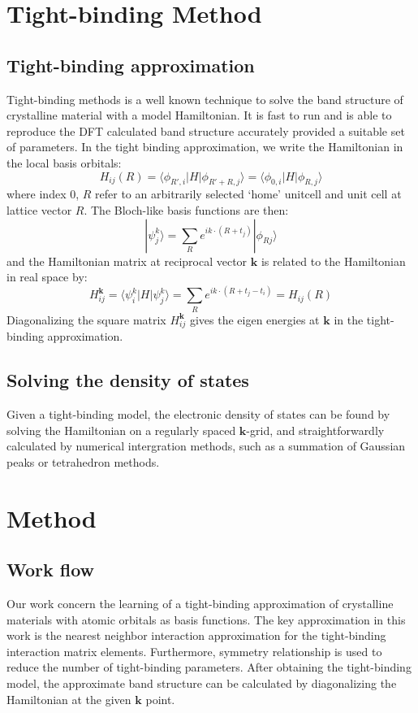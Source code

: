 \documentclass{article}
\begin{document}
\section{Tight-binding Method}
\subsection{Tight-binding approximation}
Tight-binding methods is a well known technique to solve the band structure of 
crystalline material with a model Hamiltonian\cite{ziman_principles_1999}. 
It is fast to run and is able to 
reproduce the DFT calculated band structure accurately provided a suitable set of 
parameters. 
In the tight binding approximation, we write the Hamiltonian in the local 
basis orbitals:
\begin{equation}
    H_{ij}(R) = \langle \phi_{R',i} | H | \phi_{R'+R,j} \rangle = \langle \phi_{0,i} | H | \phi_{R,j} \rangle
\end{equation}
where index 0, $R$ refer to an arbitrarily selected `home' unitcell and unit cell at 
lattice vector $R$. The Bloch-like basis functions are then:
\begin{equation}
    |\psi_j^k\rangle = \sum_R e^{ik\cdot(R+t_j)} |\phi_{Rj} \rangle
\end{equation}
and the Hamiltonian matrix at reciprocal vector $\mathbf{k}$ is related to the 
Hamiltonian in real space by:
\begin{equation}
    H_{ij}^{\mathbf{k}} = \langle \psi_i^k | H |\psi_j^k\rangle = \sum_R e^{ik\cdot(R+t_j-t_i)} = H_{ij}(R)
\end{equation}
Diagonalizing the square matrix $H_{ij}^{\mathbf{k}}$ gives the eigen energies at $\mathbf{k}$
in the tight-binding approximation. 

\subsection{Solving the density of states}
Given a tight-binding model, the electronic density of states can be found by solving the 
Hamiltonian on a regularly spaced $\mathbf{k}$-grid, and straightforwardly calculated 
by numerical intergration methods, such as a summation of Gaussian peaks or tetrahedron methods. 

\section{Method}
\subsection{Work flow}
Our work concern the learning of a tight-binding approximation of crystalline materials 
with atomic orbitals as basis functions. The key approximation in this work is the 
nearest neighbor interaction approximation for the tight-binding interaction matrix elements. 
Furthermore, symmetry relationship is used to reduce the number of tight-binding parameters.
After obtaining the tight-binding model, the approximate band structure can be calculated 
by diagonalizing the Hamiltonian at the given $\mathbf{k}$ point. 
\end{document}
